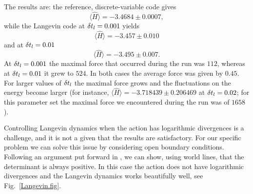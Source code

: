 The results are: the reference, discrete-variable code gives
\begin{equation}
 \langle  \hat{H} \rangle  =  -3.4684 \pm 0.0007,
\end{equation} 
while the Langevin code at $ \delta t_{l} = 0.001$  yields 
\begin{equation}
 \langle  \hat{H} \rangle  =  -3.457 \pm 0.010 
\end{equation} 
and at $ \delta t_{l} = 0.01$
\begin{equation}
 \langle  \hat{H} \rangle  = -3.495 \pm 0.007\text{.}
\end{equation} 
 At $ \delta t_{l} = 0.001$   the maximal force that occurred during the run was 
$ 112$, whereas at $ \delta t_{l} = 0.01$ it grew to $524$.    In both cases the average force was given by $0.45$.   For larger values of  $ \delta t_{l} $ the maximal force grows and the fluctuations on the energy become  larger
(for instance, $ \langle  \hat{H} \rangle  =  -3.718439    \pm   0.206469 $  at $ \delta t_{l} = 0.02$; for this parameter set the maximal force we encountered during the run was of $1658$).

Controlling Langevin dynamics when the action has logarithmic divergences is a challenge, and it is not a given that the results are satisfactory.  For our specific problem we can solve this issue by considering open boundary conditions. Following an argument put forward in \cite{Assaad07}, we can show, using world lines, that the determinant is always positive.   In this case the  action does not  have logarithmic divergences and the Langevin dynamics works beautifully well, see Fig.~\ref{Langevin.fig}. 

